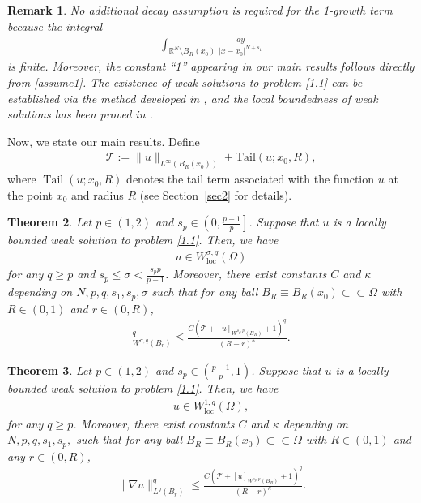\documentclass[reqno,10pt]{amsart}
\numberwithin{equation}{section}
\newtheorem{theorem}{Theorem}[section]
\newtheorem{remark}[theorem]{Remark}
\begin{document}
\begin{remark}
	\label{rem0}
	No additional decay assumption is required for the 1-growth term because the integral
	\begin{align}
		\label{assume1}
		\int_{\mathbb{R}^N \setminus B_R(x_0)} \frac{dy}{|x - x_0|^{N + s_1}}
	\end{align}
	is finite.
	Moreover, the constant “1” appearing in our main results follows directly from \eqref{assume1}.
	The existence of weak solutions to problem \eqref{1.1} can be established via the method developed in \cite{B23}, and the local boundedness of weak solutions has been proved in \cite[Section~3]{LZ25}.
\end{remark}





Now, we state our main results. Define
\begin{align*}
	\mathcal{T}:=\|u\|_{L^\infty(B_{R}(x_0))}+\mathrm{Tail}(u;x_0,R),
\end{align*}
where $\operatorname{Tail}(u; x_0, R)$ denotes the tail term associated with the function $u$ at the point $x_0$ and radius $R$ (see Section~\ref{sec2} for details).

\begin{theorem}
	\label{th12}
	Let $p\in (1, 2)$ and $s_p\in \left(0, \frac{p-1}{p}\right]$. Suppose that $u$ is a locally bounded weak solution to problem \eqref{1.1}. Then, we have 
	\begin{align*}
		u \in W_{\mathrm{loc}}^{\sigma, q}(\Omega)
	\end{align*}
	for any $q\geq p$ and $s_p\leq \sigma<\frac{s_pp}{p-1}$. Moreover, there exist constants 
	$C$ and $\kappa$ depending on $N, p, q, s_1, s_p, \sigma$ 
	such that for any ball $B_R \equiv B_R\left(x_0\right) \subset \subset \Omega$ with $R\in (0,1)$ and $r\in (0,R)$,
	\begin{align*}
		[u]_{W^{\sigma,q}\left(B_r\right)}^q \leq \frac{C\left(\mathcal{T}+[u]_{W^{s_p,p}\left(B_R\right)}+1\right)^q}{(R-r)^{\kappa}}.
	\end{align*}
\end{theorem}

\begin{theorem}
	\label{th26}
	Let $p\in(1,2)$ and $s_p\in \left(\frac{p-1}{p},1\right)$. Suppose  that $u$ is a locally bounded weak solution to problem \eqref{1.1}. Then, we have 
	\begin{align*}
		u \in W_{\mathrm{loc}}^{1,q}(\Omega) ,
	\end{align*} 
	for any $q\geq p$. Moreover, there exist constants $C$ and $\kappa$ depending on $N, p, q, s_1, s_p,$ such that for 
	any ball  $B_R \equiv B_R\left(x_0\right)\subset\subset\Omega$ with $R\in (0,1)$ and any $r\in (0,R)$,
	\begin{align*}
		\|\nabla u\|_{L^q\left(B_r\right)}^q \leq \frac{C\left(\mathcal{T}+[u]_{W^{s_p, p}\left(B_R\right)}+1\right)^q}{(R-r)^{\kappa} } .
	\end{align*}
\end{theorem}
\end{document}
